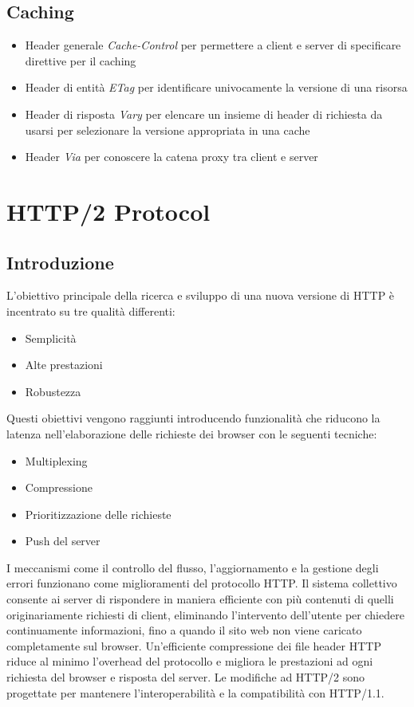 \documentclass[a4paper,11pt]{article}
\begin{document}
\subsection{Caching}
\begin{itemize}
    \item Header generale \textit{Cache-Control} per permettere a client e server di specificare direttive per il caching
    \item Header di entità \textit{ETag} per identificare univocamente la versione di una risorsa
    \item Header di risposta \textit{Vary} per elencare un insieme di header di richiesta da usarsi per selezionare la versione appropriata in una cache
    \item Header \textit{Via} per conoscere la catena proxy tra client e server
\end{itemize}
\pagebreak
\section{HTTP/2 Protocol}
\subsection{Introduzione}
L’obiettivo principale della ricerca e sviluppo di una nuova versione di HTTP è incentrato su tre qualità differenti:
\begin{itemize}
    \item Semplicità
    \item Alte prestazioni
    \item Robustezza
\end{itemize}
Questi obiettivi vengono raggiunti introducendo funzionalità che riducono la latenza nell’elaborazione delle richieste dei browser con le seguenti tecniche:
\begin{itemize}
    \item Multiplexing
    \item Compressione
    \item Prioritizzazione delle richieste
    \item Push del server
\end{itemize}
I meccanismi come il controllo del flusso, l’aggiornamento e la gestione degli errori funzionano come miglioramenti del protocollo HTTP.\newline
Il sistema collettivo consente ai server di rispondere in maniera efficiente con più contenuti di quelli originariamente richiesti di client, eliminando l’intervento dell’utente per chiedere continuamente informazioni, fino a quando il sito web non viene caricato completamente sul browser.\newline
Un’efficiente compressione dei file header HTTP riduce al minimo l’overhead del protocollo e migliora le prestazioni ad ogni richiesta del browser e risposta del server.\newline
Le modifiche ad HTTP/2 sono progettate per mantenere l’interoperabilità e la compatibilità con HTTP/1.1.
\end{document}
